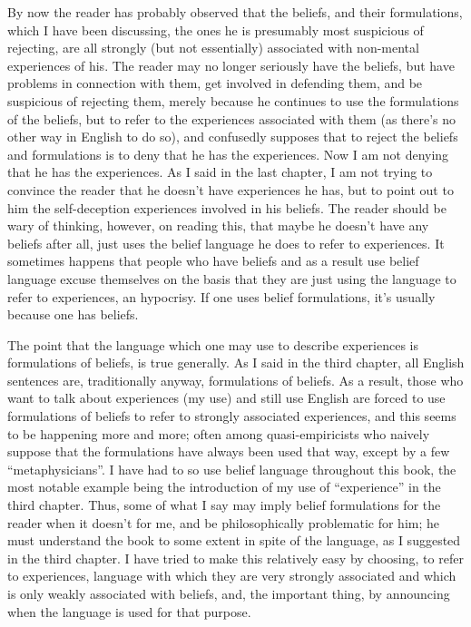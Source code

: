 By now the reader has probably observed that the beliefs, and their 
formulations, which I have been discussing, the ones he is presumably most 
suspicious of rejecting, are all strongly (but not essentially) associated with 
non-mental experiences of his. The reader may no longer seriously have the 
beliefs, but have problems in connection with them, get involved in 
defending them, and be suspicious of rejecting them, merely because he 
continues to use the formulations of the beliefs, but to refer to the 
experiences associated with them (as there's no other way in English to do 
so), and confusedly supposes that to reject the beliefs and formulations is to 
deny that he has the experiences. Now I am not denying that he has the 
experiences. As I said in the last chapter, I am not trying to convince the 
reader that he doesn't have experiences he has, but to point out to him the 
self-deception experiences involved in his beliefs. The reader should be wary 
of thinking, however, on reading this, that maybe he doesn't have any beliefs 
after all, just uses the belief language he does to refer to experiences. It 
sometimes happens that people who have beliefs and as a result use belief 
language excuse themselves on the basis that they are just using the language 
to refer to experiences, an hypocrisy. If one uses belief formulations, it's 
usually because one has beliefs. 

The point that the language which one may use to describe experiences 
is formulations of beliefs, is true generally. As I said in the third chapter, all 
English sentences are, traditionally anyway, formulations of beliefs. As a 
result, those who want to talk about experiences (my use) and still use 
English are forced to use formulations of beliefs to refer to strongly 
associated experiences, and this seems to be happening more and more; often 
among quasi-empiricists who naively suppose that the formulations have 
always been used that way, except by a few \enquote{metaphysicians}. I have had to 
so use belief language throughout this book, the most notable example being 
the introduction of my use of \enquote{experience} in the third chapter. Thus, some 
of what I say may imply belief formulations for the reader when it doesn't 
for me, and be philosophically problematic for him; he must understand the 
book to some extent in spite of the language, as I suggested in the third 
chapter. I have tried to make this relatively easy by choosing, to refer to 
experiences, language with which they are very strongly associated and 
which is only weakly associated with beliefs, and, the important thing, by 
announcing when the language is used for that purpose. 

